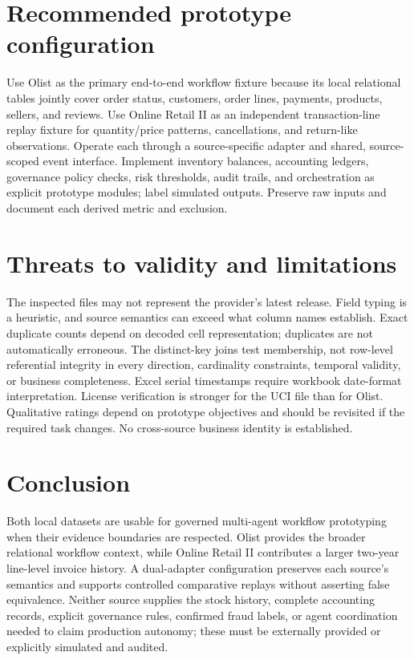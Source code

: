 \documentclass[11pt,a4paper]{article}
\begin{document}
\section{Recommended prototype configuration}
Use Olist as the primary end-to-end workflow fixture because its local relational tables jointly cover order status, customers, order lines, payments, products, sellers, and reviews. Use Online Retail II as an independent transaction-line replay fixture for quantity/price patterns, cancellations, and return-like observations. Operate each through a source-specific adapter and shared, source-scoped event interface. Implement inventory balances, accounting ledgers, governance policy checks, risk thresholds, audit trails, and orchestration as explicit prototype modules; label simulated outputs. Preserve raw inputs and document each derived metric and exclusion.

\section{Threats to validity and limitations}
The inspected files may not represent the provider's latest release. Field typing is a heuristic, and source semantics can exceed what column names establish. Exact duplicate counts depend on decoded cell representation; duplicates are not automatically erroneous. The distinct-key joins test membership, not row-level referential integrity in every direction, cardinality constraints, temporal validity, or business completeness. Excel serial timestamps require workbook date-format interpretation. License verification is stronger for the UCI file than for Olist. Qualitative ratings depend on prototype objectives and should be revisited if the required task changes. No cross-source business identity is established.

\section{Conclusion}
Both local datasets are usable for governed multi-agent workflow prototyping when their evidence boundaries are respected. Olist provides the broader relational workflow context, while Online Retail II contributes a larger two-year line-level invoice history. A dual-adapter configuration preserves each source's semantics and supports controlled comparative replays without asserting false equivalence. Neither source supplies the stock history, complete accounting records, explicit governance rules, confirmed fraud labels, or agent coordination needed to claim production autonomy; these must be externally provided or explicitly simulated and audited.



\end{document}
